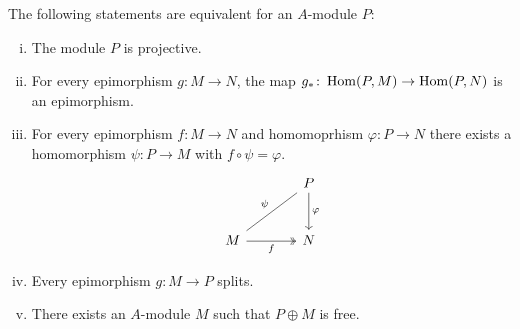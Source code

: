 \begin{izrek}
The following statements are equivalent for an $A$-module $P$:

\begin{enumerate}[i)]
\item The module $P$ is projective.
\item For every epimorphism $g \colon M \to N$, the map
$g_* \colon \operatorname{Hom}(P, M) \to \operatorname{Hom}(P, N)$ is an epimorphism.
\item For every epimorphism $f \colon M \to N$ and homomoprhism
$\varphi \colon P \to N$ there exists a homomorphism
$\psi \colon P \to M$ with $f \circ \psi = \varphi$.
\[
\begin{tikzcd}[row sep=large, column sep=large]
&
P \arrow[dl, dash, "\psi"'] \arrow[d, "\varphi"] \\
M \arrow[r, two heads, "f"'] &
N
\end{tikzcd}
\]
\item Every epimorphism $g \colon M \to P$ splits.
\item There exists an $A$-module $M$ such that $P \oplus M$ is
free.
\end{enumerate}
\end{izrek}

